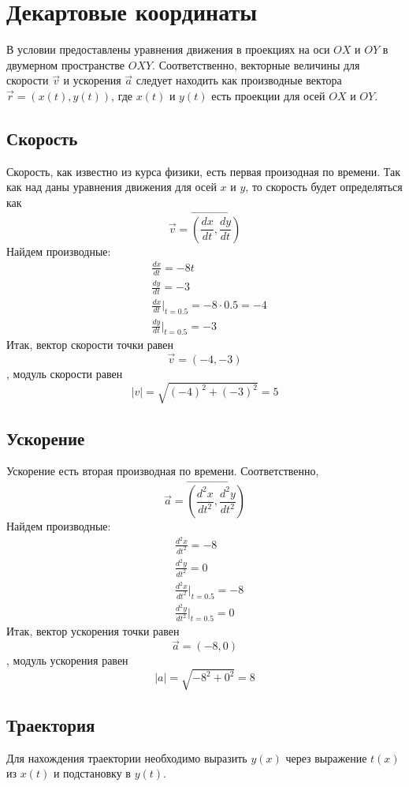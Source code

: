 \section{Декартовые координаты}
В условии предоставлены уравнения движения в проекциях на оси $OX$ и $OY$
в двумерном пространстве $OXY$. Соответственно, векторные величины для
скорости $\vec{v}$ и ускорения $\vec{a}$ следует находить как производные
вектора $\vec{r}=(x(t), y(t))$, где $x(t)$ и $y(t)$ есть проекции
для осей $OX$ и $OY$.

\subsection{Скорость}
Скорость, как известно из курса физики, есть первая произодная по времени.
Так как над даны уравнения движения для осей $x$ и $y$, то скорость будет
определяться как $$ \vec{v} = \vec{(\frac{dx}{dt}, \frac{dy}{dt})} $$
Найдем производные:
\begin{align}
    &\frac{dx}{dt} = -8t \\
    &\frac{dy}{dt} = -3 \\
    &\frac{dx}{dt} \bigg|_{t=0.5} = -8 \cdot 0.5 = -4 \\
    &\frac{dy}{dt} \bigg|_{t=0.5} = -3
\end{align}
Итак, вектор скорости точки равен $$ \vec{v} = ( -4, -3 ) $$,
модуль скорости равен $$ \left|{v}\right| = \sqrt{(-4)^{2} + (-3)^{2}} = 5 $$

\subsection{Ускорение}
Ускорение есть вторая производная по времени. Соответственно,
$$ \vec{a} = \vec{(\frac{d^{2}x}{dt^{2}}, \frac{d^{2}y}{dt^{2}})} $$
Найдем производные:
\begin{align}
    &\frac{d^{2}x}{dt^{2}} = -8 \\
    &\frac{d^{2}y}{dt^{2}} = 0 \\
    &\frac{d^{2}x}{dt^{2}} \bigg|_{t=0.5} = -8 \\
    &\frac{d^{2}y}{dt^{2}} \bigg|_{t=0.5} = 0
\end{align}
Итак, вектор ускорения точки равен $$ \vec{a} = ( -8, 0 ) $$,
модуль ускорения равен $$ \left|{a}\right| = \sqrt{-8^{2} + 0^{2}} = 8 $$

\subsection{Траектория}
Для нахождения траектории необходимо выразить $y(x)$ через
выражение $t(x)$ из $x(t)$ и подстановку в $y(t)$.


